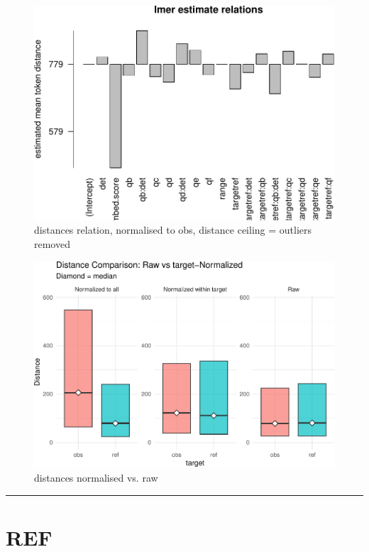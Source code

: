 \documentclass[12pt,a4paper]{article}
\begin{document}
\begin{figure}[H]
\includegraphics{spund-pub_files/figure-latex/lmeplot-1} \caption{distances relation, normalised to obs, distance ceiling =  outliers removed}\label{fig:lmeplot}
\end{figure}

\begin{figure}[H]
\includegraphics{spund-pub_files/figure-latex/gplot-1} \caption{distances normalised vs. raw}\label{fig:gplot}
\end{figure}

\begin{center}\rule{0.5\linewidth}{0.5pt}\end{center}

\section{REF}\label{ref-1}
\end{document}
